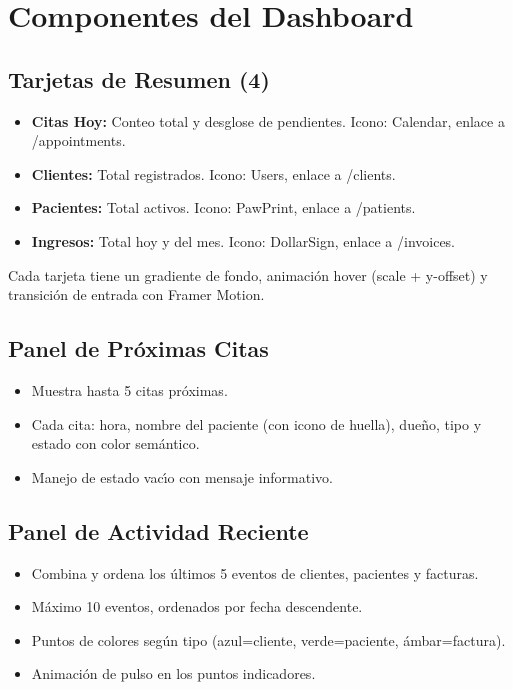 \section{Componentes del Dashboard}

\subsection{Tarjetas de Resumen (4)}

\begin{itemize}[leftmargin=*]
    \item \textbf{Citas Hoy:} Conteo total y desglose de pendientes.
          Icono: Calendar, enlace a /appointments.
    \item \textbf{Clientes:} Total registrados. Icono: Users,
          enlace a /clients.
    \item \textbf{Pacientes:} Total activos. Icono: PawPrint,
          enlace a /patients.
    \item \textbf{Ingresos:} Total hoy y del mes. Icono: DollarSign,
          enlace a /invoices.
\end{itemize}

Cada tarjeta tiene un gradiente de fondo, animaci\'on hover (scale + y-offset)
y transici\'on de entrada con Framer Motion.

\subsection{Panel de Pr\'oximas Citas}

\begin{itemize}[leftmargin=*]
    \item Muestra hasta 5 citas pr\'oximas.
    \item Cada cita: hora, nombre del paciente (con icono de huella),
          due\~no, tipo y estado con color sem\'antico.
    \item Manejo de estado vac\'{\i}o con mensaje informativo.
\end{itemize}

\subsection{Panel de Actividad Reciente}

\begin{itemize}[leftmargin=*]
    \item Combina y ordena los \'ultimos 5 eventos de clientes, pacientes
          y facturas.
    \item M\'aximo 10 eventos, ordenados por fecha descendente.
    \item Puntos de colores seg\'un tipo (azul=cliente, verde=paciente,
          \'ambar=factura).
    \item Animaci\'on de pulso en los puntos indicadores.
\end{itemize}

